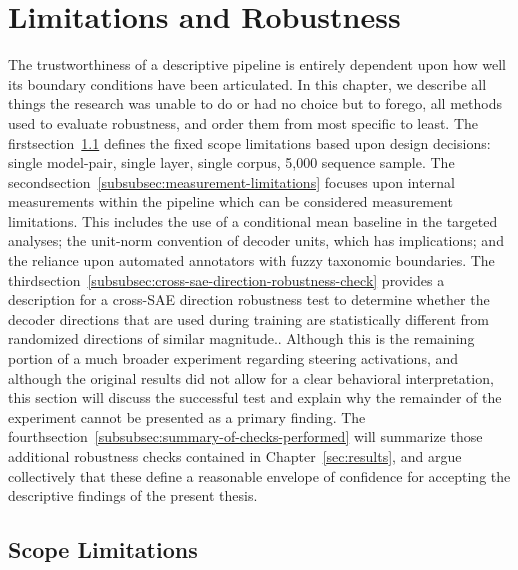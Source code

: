 \pagestyle{fancy}

\section{Limitations and Robustness}
\label{sec:discussion}
\label{sec:limitations-robustness}

The trustworthiness of a descriptive pipeline is entirely dependent upon how well its boundary conditions have been articulated. In this chapter, we describe all things the research was unable to do or had no choice but to forego, all methods used to evaluate robustness, and order them from most specific to least. The firstsection~\ref{subsubsec:scope-limitations} defines the fixed scope limitations based upon design decisions: single model-pair, single layer, single corpus, 5,000 sequence sample. The secondsection~\ref{subsubsec:measurement-limitations} focuses upon internal measurements within the pipeline which can be considered measurement limitations. This includes the use of a conditional mean baseline in the targeted analyses; the unit-norm convention of decoder units, which has implications; and the reliance upon automated annotators with fuzzy taxonomic boundaries. The thirdsection~\ref{subsubsec:cross-sae-direction-robustness-check} provides a description for a cross-SAE direction robustness test to determine whether the decoder directions that are used during training are statistically different from randomized directions of similar magnitude.. Although this is the remaining portion of a much broader experiment regarding steering activations, and although the original results did not allow for a clear behavioral interpretation, this section will discuss the successful test and explain why the remainder of the experiment cannot be presented as a primary finding. The fourthsection~\ref{subsubsec:summary-of-checks-performed} will summarize those additional robustness checks contained in Chapter~\ref{sec:results}, and argue collectively that these define a reasonable envelope of confidence for accepting the descriptive findings of the present thesis.

\subsection{Scope Limitations}
\label{subsubsec:scope-limitations}


